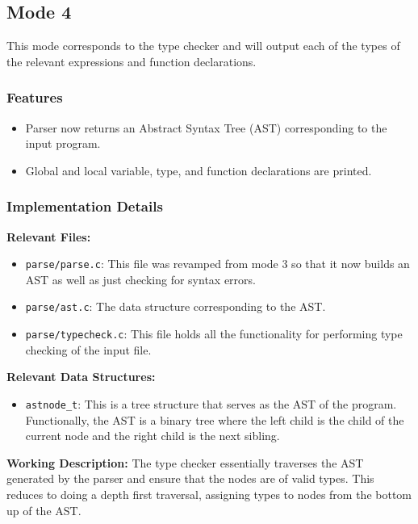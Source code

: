 \subsection{Mode 4}
\label{sec:mode-4}

This mode corresponds to the type checker and will output each of the types of
the relevant expressions and function declarations.

\subsubsection{Features}

\begin{itemize}
    \item Parser now returns an Abstract Syntax Tree (AST) corresponding to the input program.
    \item Global and local variable, type, and function declarations are printed.
\end{itemize}

\subsubsection{Implementation Details}

\textbf{Relevant Files:}

\begin{itemize}
    \item \verb|parse/parse.c|: This file was revamped from mode 3 so that it now builds an AST as well as just checking for syntax errors.
    \item \verb|parse/ast.c|: The data structure corresponding to the AST.
    \item \verb|parse/typecheck.c|: This file holds all the functionality for performing type checking of the input file.
\end{itemize}

\noindent \textbf{Relevant Data Structures:}

\begin{itemize}
    \item \verb|astnode_t|: This is a tree structure that serves as the AST of the program. Functionally, the AST is a binary tree where the left child is the child of the current node and the right child is the next sibling. 
\end{itemize}

\noindent \textbf{Working Description:} The type checker essentially traverses
the AST generated by the parser and ensure that the nodes are of valid types.
This reduces to doing a depth first traversal, assigning types to nodes from the
bottom up of the AST.

